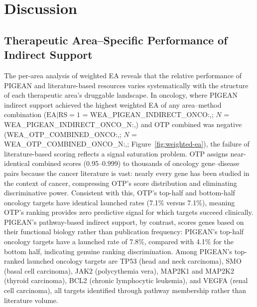 \section{Discussion}\label{sec:discussion}


\subsection{Therapeutic Area--Specific Performance of Indirect Support}

The per-area analysis of weighted EA reveals that the relative performance of PIGEAN and literature-based resources varies systematically with the structure of each therapeutic area's druggable landscape. In oncology, where PIGEAN indirect support achieved the highest weighted EA of any area--method combination ($\text{EA}|\text{RS}{=}1$ = {{WEA_PIGEAN_INDIRECT_ONCO:,}}; $N$ = {{WEA_PIGEAN_INDIRECT_ONCO_N:,}}) and OTP combined was negative ({{WEA_OTP_COMBINED_ONCO:,}}; $N$ = {{WEA_OTP_COMBINED_ONCO_N:,}}; Figure~\ref{fig:weighted-ea}), the failure of literature-based scoring reflects a signal saturation problem. OTP assigns near-identical combined scores (0.95--0.999) to thousands of oncology gene--disease pairs because the cancer literature is vast: nearly every gene has been studied in the context of cancer, compressing OTP's score distribution and eliminating discriminative power. Consistent with this, OTP's top-half and bottom-half oncology targets have identical launched rates (7.1\% versus 7.1\%), meaning OTP's ranking provides zero predictive signal for which targets succeed clinically. PIGEAN's pathway-based indirect support, by contrast, scores genes based on their functional biology rather than publication frequency: PIGEAN's top-half oncology targets have a launched rate of 7.8\%, compared with 4.1\% for the bottom half, indicating genuine ranking discrimination. Among PIGEAN's top-ranked launched oncology targets are TP53 (head and neck carcinoma), SMO (basal cell carcinoma), JAK2 (polycythemia vera), MAP2K1 and MAP2K2 (thyroid carcinoma), BCL2 (chronic lymphocytic leukemia), and VEGFA (renal cell carcinoma), all targets identified through pathway membership rather than literature volume.

